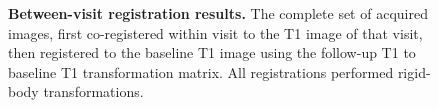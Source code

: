 \begin{figure}
{} \hspace*{-0.9em}
\newline
   \hspace*{-0.9em}
\hfill
   \hspace*{-0.9em}
\hfill
   \hspace*{-0.9em}
\hfill
   \hspace*{-0.9em}
\caption{{\bf Between-visit registration results.} The complete set of acquired images, first co-registered within visit to the T1 image of that visit, then registered to the baseline T1 image using the follow-up T1 to baseline T1 transformation matrix.  All registrations performed rigid-body transformations.}
\label{fig:reg_results}
\end{figure}



